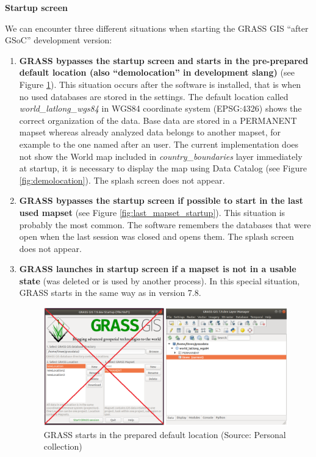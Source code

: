 \documentclass[a4paper,10pt,twoside]{article}
\begin{document}
\newpage
\vspace*{-1cm}
\bigskip
\noindent \textbf {Startup screen}

\noindent We can encounter three different situations when starting
the GRASS GIS ``after GSoC'' development version:

\begin{enumerate}

\item \textbf{GRASS bypasses the startup screen and starts in the
    pre-prepared default location (also ``demolocation'' in
    development slang)} (see Figure
  \ref{fig:demolocation_startup}). This situation occurs after the
  software is installed, that is when no used databases are stored in
  the settings. The default location called
  \textit{world\_latlong\_wgs84} in WGS84 coordinate system
  (EPSG:4326) shows the correct organization of the data. Base data
  are stored in a PERMANENT mapset whereas already analyzed data
  belongs to another mapset, for example to the one named after an
  user. The current implementation does not show the World map
  included in \textit{country\_boundaries} layer immediately at
  startup, it is necessary to display the map using Data Catalog (see
  Figure \ref{fig:demolocation}). The splash screen does not appear.
\item\textbf{ GRASS bypasses the startup screen if possible to start
    in the last used mapset} (see Figure
  \ref{fig:last_mapset_startup}). This situation is probably the most
  common. The software remembers the databases that were open when the
  last session was closed and opens them.  The splash screen does not
  appear.
\item \textbf{GRASS launches in startup screen if a mapset is not in a
    usable state} (was deleted or is used by another process). In this
  special situation, GRASS starts in the same way as in version 7.8.

\vspace{0.3cm}
\begin{figure}[hbt!] 
\begin{center}
\includegraphics[width=17cm]{../pictures/demolocation_startup.png} 
\caption[GRASS starts in the prepared default location]{GRASS starts in the prepared default location (Source: Personal collection)}
\label{fig:demolocation_startup}
\end{center}
\end{figure}


\end{enumerate}
\end{document}

